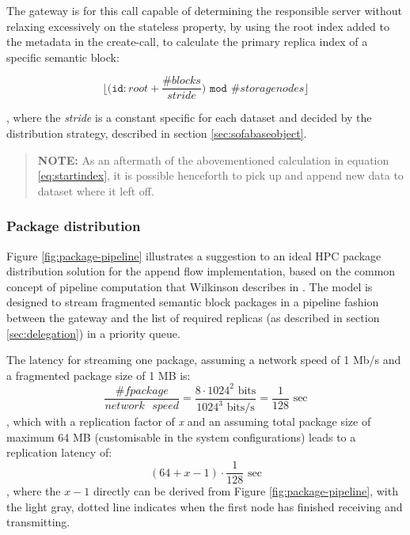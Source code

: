 The gateway is for this call capable of determining the responsible server without relaxing excessively on the stateless property, by using the root index added to the metadata in the create-call, to calculate the primary replica index of a specific semantic block:

\vspace*{2mm}
\begin{equation} \label{eq:startindex}
	\Big\lfloor\Big(\texttt{id}:root + \dfrac{\texttt{\#}blocks}{stride}\Big) \texttt{ mod } \texttt{\#}storagenodes\Big\rfloor
\end{equation}

, where the \textit{stride} is a constant specific for each dataset and decided by the distribution strategy, described in section \ref{sec:sofabaseobject}.

\begin{quotation}
	{\sffamily\textbf{NOTE:}} As an aftermath of the abovementioned calculation in equation \ref{eq:startindex}, it is possible henceforth to pick up and append new data to dataset where it left off.
\end{quotation}

\subsubsection*{Package distribution}
Figure \ref{fig:package-pipeline} illustrates a suggestion to an ideal HPC package distribution solution for the append flow implementation, based on the common concept of pipeline computation that Wilkinson \etal describes in \cite{Wilkinson:1998:PPT:289352}. The model is designed to stream fragmented semantic block packages in a pipeline fashion between the gateway and the list of required replicas (as described in section \ref{sec:delegation}) in a priority queue.
\newline

The latency for streaming one package, assuming a network speed of 1 Mb/s and a fragmented package size of 1 MB is:
\begin{equation}
	\dfrac{\texttt{\#}fpackage}{network\text{ }speed} = \dfrac{8\cdot 1024^2 \text{ bits}}{1024^3 \text{ bits/s}} = \dfrac{1}{128} \text{ sec}
\end{equation}
, which with a replication factor of \textit{x} and an assuming total package size of maximum 64 MB (customisable in the system configurations) leads to a replication latency of:
\begin{equation}
	(64 + x - 1) \cdot \dfrac{1}{128} \text{ sec}
\end{equation}
, where the $x - 1$ directly can be derived from Figure \ref{fig:package-pipeline}, with the light gray, dotted line indicates when the first node has finished receiving and transmitting.
\newline

